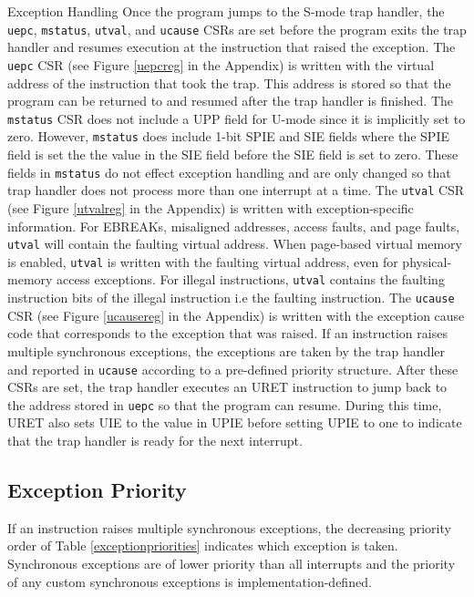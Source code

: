 \documentclass[12pt]{article}
\begin{document}
\begin{section}{Exception Handling}
Once the program jumps to the S-mode trap handler, the {\tt{uepc}}, {\tt{mstatus}}, {\tt{utval}}, and {\tt{ucause}} CSRs are set before the program exits the trap handler and resumes execution at the instruction that raised the exception. The {\tt{uepc}} CSR (see Figure \ref{uepcreg} in the Appendix) is written with the virtual address of the instruction that took the trap. This address is stored so that the program can be returned to and resumed after the trap handler is finished. The {\tt{mstatus}} CSR does not include a UPP field for U-mode since it is implicitly set to zero. However, {\tt{mstatus}} does include 1-bit SPIE and SIE fields where the SPIE field is set the the value in the SIE field before the SIE field is set to zero. These fields in {\tt{mstatus}} do not effect exception handling and are only changed so that trap handler does not process more than one interrupt at a time. The {\tt{utval}} CSR (see Figure \ref{utvalreg} in the Appendix) is written with exception-specific information. For EBREAKs, misaligned addresses, access faults, and page faults, {\tt{utval}} will contain the faulting virtual address. When page-based virtual memory is enabled, {\tt{utval}} is written with the faulting virtual address, even for physical-memory access exceptions. For illegal instructions, {\tt{utval}} contains the faulting instruction bits of the illegal instruction i.e the faulting instruction. The {\tt{ucause}} CSR (see Figure \ref{ucausereg} in the Appendix) is written with the exception cause code that corresponds to the exception that was raised. If an instruction raises multiple synchronous exceptions, the exceptions are taken by the trap handler and reported in {\tt{ucause}} according to a pre-defined priority structure. After these CSRs are set, the trap handler executes an URET instruction to jump back to the address stored in {\tt{uepc}} so that the program can resume. During this time, URET also sets UIE to the value in UPIE before setting UPIE to one to indicate that the trap handler is ready for the next interrupt.
\end{section}

\subsection{Exception Priority}
If an instruction raises multiple synchronous exceptions, the decreasing priority order of Table \ref{exceptionpriorities} indicates which exception is taken. Synchronous exceptions are of lower priority than all interrupts and the priority of any custom synchronous exceptions is implementation-defined. 
\end{document}
